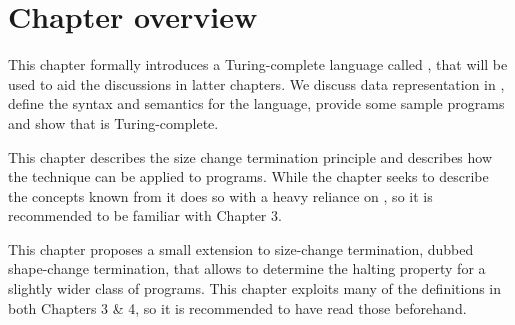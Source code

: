 \section{Chapter overview}

\begin{description}[\setleftmargin{70pt}\setlabelstyle{\bf}]

\item [Chapter 2]

\item [Chapter 3] This chapter formally introduces a Turing-complete language
called \D{}, that will be used to aid the discussions in latter chapters. We
discuss data representation in \D{}, define the syntax and semantics for the
language, provide some sample programs and show that \D{} is Turing-complete.

\item [Chapter 4] This chapter describes the size change termination principle
and describes how the technique can be applied to \D{} programs. While the
chapter seeks to describe the concepts known from \cite{size-change} it does so
with a heavy reliance on \D{}, so it is recommended to be familiar with Chapter
3.

\item [Chapter 5] This chapter proposes a small extension to size-change
termination, dubbed shape-change termination, that allows to determine the
halting property for a slightly wider class of programs. This chapter exploits
many of the definitions in both Chapters 3 \& 4, so it is recommended to have
read those beforehand.

\end{description}
